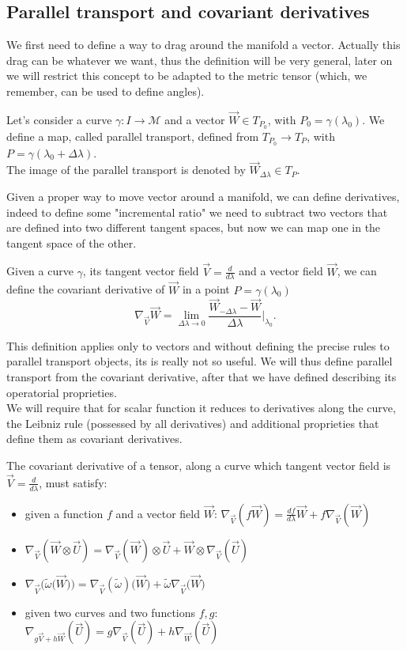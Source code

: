 \subsection{Parallel transport and covariant derivatives}
We first need to define a way to drag around the manifold a vector. Actually this drag can be whatever we want, thus the definition will be very general, later on we will restrict this concept to be adapted to the metric tensor (which, we remember, can be used to define angles).
\begin{defin}
    Let's consider a curve $\gamma:I\rightarrow\mathcal{M}$ and a vector $\vec W\in T_{P_0}$, with $P_0=\gamma(\lambda_0)$. We define a map, called parallel transport, defined from $T_{P_0}\rightarrow T_{P}$, with $P=\gamma(\lambda_0+\Delta \lambda)$.\\The image of the parallel transport is denoted by $\vec W_{\Delta \lambda}\in T_P$.
\end{defin}
Given a proper way to move vector around a manifold, we can define derivatives, indeed to define some "incremental ratio" we need to subtract two vectors that are defined into two different tangent spaces, but now we can map one in the tangent space of the other.
\begin{defin}
    Given a curve $\gamma$, its tangent vector field $\vec V=\frac{d}{d\lambda}$ and a vector field $\vec W$, we can define the covariant derivative of $\vec W$ in a point $P=\gamma(\lambda_0)$ $$\nabla_{\vec{V}}\vec{W}=\lim_{\Delta\lambda\rightarrow0}\frac{\vec{W}_{-\Delta\lambda}-\vec{W}}{\Delta\lambda}\bigg|_{\lambda_0}.$$
\end{defin}
This definition applies only to vectors and without defining the precise rules to parallel transport objects, its is really not so useful. We will thus define parallel transport from the covariant derivative, after that we have defined describing its operatorial proprieties.\\
We will require that for scalar function it reduces to derivatives along the curve, the Leibniz rule (possessed by all derivatives) and additional proprieties that define them as covariant derivatives.
\begin{defin}
    The covariant derivative of a tensor, along a curve which tangent vector field is $\vec V=\frac{d}{d\lambda}$, must satisfy:
    \begin{itemize}
        \item given a function $f$ and a vector field $\vec W$: $\nabla_{\vec V}(f\vec W)=\frac{df}{d\lambda}\vec W+f\nabla_{\vec V}(\vec W)$
        \item $\nabla_{\vec V}(\vec W\otimes\vec U)=\nabla_{\vec V}(\vec W)\otimes\vec U+\vec W\otimes\nabla_{\vec V}(\vec U)$
        \item $\nabla_{\vec V}\big(\tilde\omega\big(\vec W\big)\big)=\nabla_{\vec V}(\tilde\omega)\big(\vec W\big)+\tilde\omega\nabla_{\vec V}\big(\vec W\big)$
        \item given two curves and two functions $f,g$: $\nabla_{g\vec V+h\vec W}(\vec U)=g\nabla_{\vec V}(\vec U)+h\nabla_{\vec W}(\vec U)$
    \end{itemize}
\end{defin}
